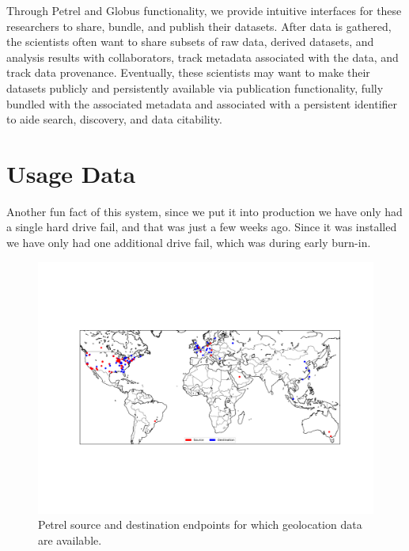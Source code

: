 \documentclass[sigconf]{acmart}
\begin{document}
Through Petrel and Globus functionality, we provide intuitive interfaces for these researchers to share, bundle, and publish their datasets. After data is gathered, the scientists often want to share subsets of raw data, derived datasets, and analysis results with collaborators, track metadata associated with the data, and track data provenance. Eventually, these scientists may want to make their datasets publicly and persistently available via publication functionality, fully bundled with the associated metadata and associated with a persistent identifier to aide search, discovery, and data citability.

\section{Usage Data}

Another fun fact of this system, since we put it into production we have only had a single hard drive fail, and that was just a few weeks ago. Since it was installed we have only had one additional drive fail, which was during early burn-in.

\begin{figure}
\centering
\includegraphics[trim=2in 3.3in 1.4in 3in,clip,width=\columnwidth]{Figures/petrel-src-dst-map2.png}

\vspace{-1ex}

\caption{Petrel source and destination endpoints for which geolocation
data are available.\label{fig:usage1}}
\end{figure}
\end{document}
